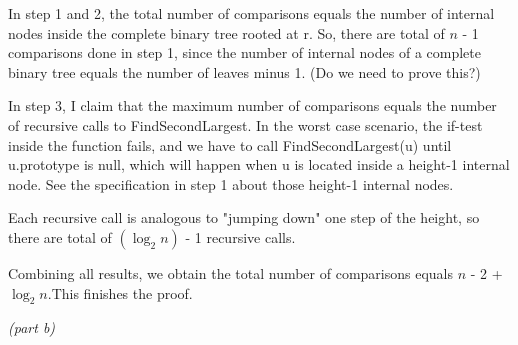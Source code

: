 \documentclass[a4paper, 10pt]{article}
\begin{document}
{\begin{addmargin}[15pt]{0in}
{In step 1 and 2, the total number of comparisons equals the number of internal nodes inside the complete binary tree rooted at r. So, there are total of $n$ - 1 comparisons done in step 1, since the number of internal nodes of a complete binary tree equals the number of leaves minus 1. (Do we need to prove this?)

In step 3, I claim that the maximum number of comparisons equals the number of recursive calls to FindSecondLargest. In the worst case scenario, the if-test inside the function fails, and we have to call FindSecondLargest(u) until u.prototype is null, which will happen when u is located inside a height-1 internal node. See the specification in step 1 about those height-1 internal nodes. 

Each recursive call is analogous to "jumping down" one step of the height, so there are total of $(\log_2 n)$ - 1 recursive calls.

Combining all results, we obtain the total number of comparisons equals $n$ - 2 + $\log_2 n.$This finishes the proof.
}
\end{addmargin}
{\noindent\large\it(part b)}

}
\end{document}
